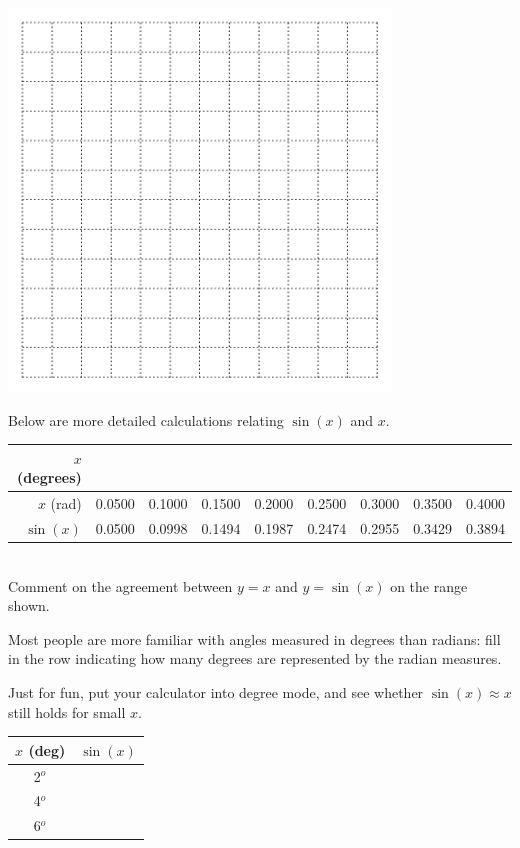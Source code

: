 \includegraphics[width=4in]{graphics/empty_graph_square_12}


\newpage  Below are more detailed calculations relating
$\sin(x)$ and $x$.  

\vspace{0.2in}

{\LARGE
	\begin{tabular}{||r||c|c|c|c|c|c|c|c||} \hline
	$x$ (degrees) &  & & & & & & & \\ \hline
	$x$ (rad) & 0.0500&          0.1000&          0.1500  & 0.2000  &0.2500 & 0.3000 & 0.3500 & 0.4000\\ \hline
	$\sin(x)$ & 0.0500 &0.0998 &0.1494 &0.1987 &0.2474 &0.2955 &0.3429 &0.3894 \\ \hline
	\end{tabular}
}\\[1ex]

\problem Comment on the agreement between $y=x$ and $y=\sin(x)$ on the range shown.

\vfill \vfill \vfill Most people are more familiar with angles
measured in degrees than radians: fill in the row indicating how many
degrees are represented by the radian measures.  \vfill

\newpage

Just for fun, put your calculator into degree mode, and see whether
$\sin(x) \approx x$ still holds for small $x$.\\[1ex]

\begin{tabular}{c|c}
  $x$ (deg) & $\sin(x)$ \\ \hline
  2$^o$ &  \\[2ex]
  4$^o$ &  \\[2ex]
  6$^o$  &  \\[2ex]
\end{tabular}


